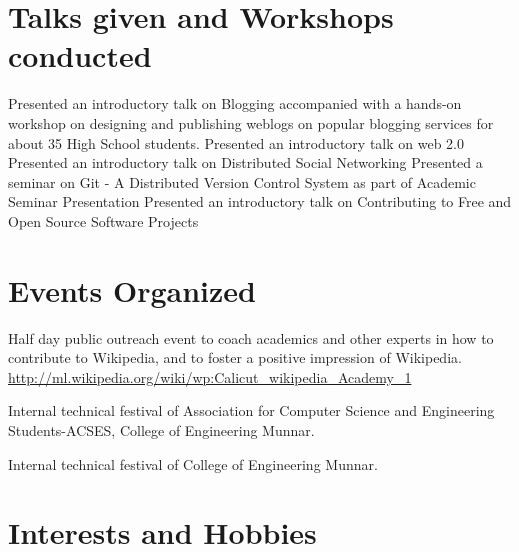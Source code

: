 \documentclass[11pt,a4paper]{moderncv}
\begin{document}

\section{Talks given and Workshops conducted}
{Presented an introductory talk on Blogging accompanied with a hands-on workshop on designing and  publishing weblogs on popular blogging services for about 35 High School students.}
{Presented an introductory talk on web 2.0} 
{Presented an introductory talk on Distributed Social Networking} 
{Presented a seminar on Git - A Distributed Version Control System as part of Academic Seminar Presentation}
{Presented an introductory talk on Contributing to Free and Open Source Software Projects}  

\section{Events Organized}

{Half day public outreach event to coach academics and other experts in how to contribute to Wikipedia, and to foster a positive impression of Wikipedia.\\
 \url{http://ml.wikipedia.org/wiki/wp:Calicut_wikipedia_Academy_1}}

{Internal technical festival of Association for Computer Science and Engineering Students-ACSES, College of Engineering Munnar.}

{Internal technical festival of College of Engineering Munnar.}


\section{Interests and Hobbies}
\end{document}
